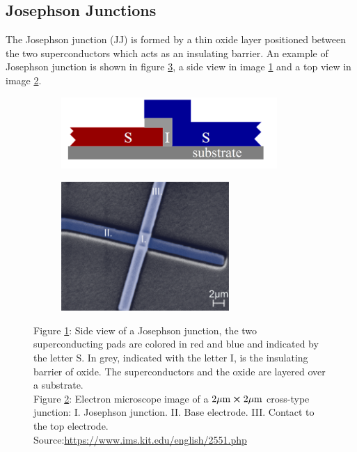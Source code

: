 \subsection{Josephson Junctions}
The Josephson junction (JJ) is formed by a thin oxide layer positioned between the two superconductors which acts as an insulating barrier. 
An example of Josephson junction is shown in figure \ref{fig:JJ}, a side view in image \ref{fig:JJ_side} and a top view in image \ref{fig:JJ_top}.
\begin{figure}[ht!]
    \centering
    \begin{subfigure}{0.45\textwidth}
        \centering
        \includegraphics[width=0.90\textwidth]{figures/png/JJ_side.png}
        \subcaption{}
        \label{fig:JJ_side}
    \end{subfigure}
    \hfill
    \begin{subfigure}{0.45\textwidth}
        \centering
        \includegraphics[width=0.70\textwidth]{figures/png/JJ_top.png}
        \subcaption{}
        \label{fig:JJ_top}
    \end{subfigure}
    \caption{Figure \ref{fig:JJ_side}: Side view of a Josephson junction, the two superconducting pads are colored in red and blue and indicated by the letter S. In grey, indicated with the letter I, is the insulating barrier of oxide. 
    The superconductors and the oxide are layered over a substrate.\\
    Figure \ref{fig:JJ_top}: Electron microscope image of a $2 \mu\text{m} \cross 2 \mu\text{m}$ cross-type junction: I. Josephson junction. II. Base electrode. III. Contact to the top electrode.\\
    Source:\url{https://www.ims.kit.edu/english/2551.php}}
    \label{fig:JJ}
\end{figure}

